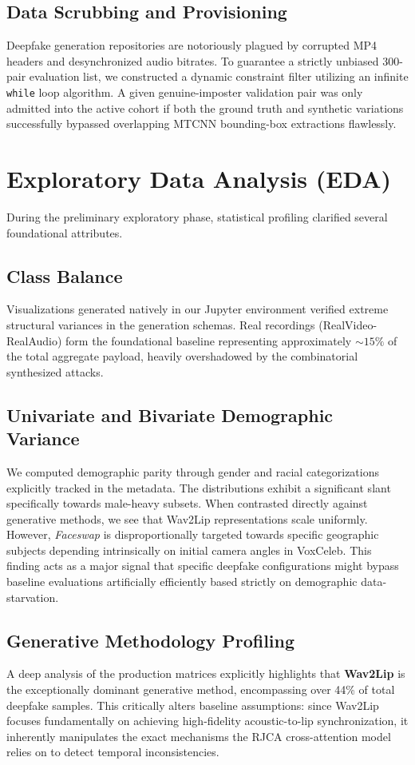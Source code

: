 \documentclass[conference]{IEEEtran}
\begin{document}
\subsection{Data Scrubbing and Provisioning}
Deepfake generation repositories are notoriously plagued by corrupted MP4 headers and desynchronized audio bitrates. To guarantee a strictly unbiased 300-pair evaluation list, we constructed a dynamic constraint filter utilizing an infinite \texttt{while} loop algorithm. A given genuine-imposter validation pair was only admitted into the active cohort if both the ground truth and synthetic variations successfully bypassed overlapping MTCNN bounding-box extractions flawlessly.

\section{Exploratory Data Analysis (EDA)}
During the preliminary exploratory phase, statistical profiling clarified several foundational attributes.

\subsection{Class Balance}
Visualizations generated natively in our Jupyter environment verified extreme structural variances in the generation schemas. Real recordings (RealVideo-RealAudio) form the foundational baseline representing approximately $\sim 15\%$ of the total aggregate payload, heavily overshadowed by the combinatorial synthesized attacks.

\subsection{Univariate and Bivariate Demographic Variance}
We computed demographic parity through gender and racial categorizations explicitly tracked in the metadata. The distributions exhibit a significant slant specifically towards male-heavy subsets. When contrasted directly against generative methods, we see that Wav2Lip representations scale uniformly. However, \textit{Faceswap} is disproportionally targeted towards specific geographic subjects depending intrinsically on initial camera angles in VoxCeleb. This finding acts as a major signal that specific deepfake configurations might bypass baseline evaluations artificially efficiently based strictly on demographic data-starvation.

\subsection{Generative Methodology Profiling}
A deep analysis of the production matrices explicitly highlights that \textbf{Wav2Lip} is the exceptionally dominant generative method, encompassing over 44\% of total deepfake samples. This critically alters baseline assumptions: since Wav2Lip focuses fundamentally on achieving high-fidelity acoustic-to-lip synchronization, it inherently manipulates the exact mechanisms the RJCA cross-attention model relies on to detect temporal inconsistencies.
\end{document}

